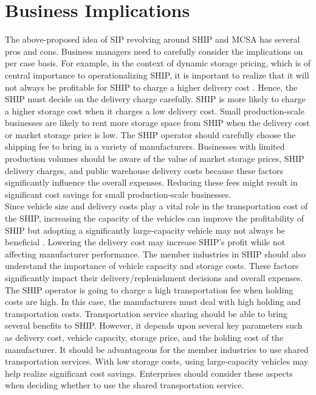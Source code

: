 \documentclass[paper=a4wide, fontsize=12pt]{scrartcl}	 %
\begin{document}
\section*{Business Implications}

The above-proposed idea of SIP revolving around SHIP and MCSA has several pros and cons. Business managers need to carefully consider the implications on per case basis. For example, in the context of dynamic storage pricing, which is of central importance to operationalizing SHIP, it is important to realize that it will not always be profitable for SHIP to charge a higher delivery cost \cite{6736130}. Hence, the SHIP must decide on the delivery charge carefully. SHIP is more likely to charge a higher storage cost when it charges a low delivery cost. Small production-scale businesses are likely to rent more storage space from SHIP when the delivery cost or market storage price is low. The SHIP operator should carefully choose the shipping fee to bring in a variety of manufacturers. Businesses with limited production volumes should be aware of the value of market storage prices, SHIP delivery charges, and public warehouse delivery costs because these factors significantly influence the overall expenses. Reducing these fees might result in significant cost savings for small production-scale businesses. \\

Since vehicle size and delivery costs play a vital role in the transportation cost of the SHIP, increasing the capacity of the vehicles can improve the profitability of SHIP but adopting a significantly large-capacity vehicle may not always be beneficial \cite{RePEc:eee:proeco}. Lowering the delivery cost may increase SHIP's profit while not affecting manufacturer performance. The member industries in SHIP should also understand the importance of vehicle capacity and storage costs. These factors significantly impact their delivery/replenishment decisions and overall expenses. The SHIP operator is going to charge a high transportation fee when holding costs are high. In this case, the manufacturers must deal with high holding and transportation costs. Transportation service sharing should be able to bring several benefits to SHIP. However, it depends upon several key parameters such as delivery cost, vehicle capacity, storage price, and the holding cost of the manufacturer. It should be advantageous for the member industries to use shared transportation services. With low storage costs, using large-capacity vehicles may help realize significant cost savings. Enterprises should consider these aspects when deciding whether to use the shared transportation service. \\
    
\end{document}
